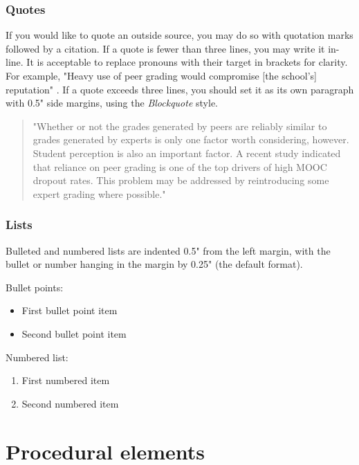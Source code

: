 \documentclass[
	letterpaper, %
]{jdf}
\begin{document}
\subsubsection{Quotes}
If you would like to quote an outside source, you may do so with quotation marks followed by a citation. If a quote is fewer than three lines, you may write it in-line. It is acceptable to replace pronouns with their target in brackets for clarity. For example, "Heavy use of peer grading would compromise [the school’s] reputation" \citep{joyner2016}. If a quote exceeds three lines, you should set it as its own paragraph with 0.5" side margins, using the \emph{Blockquote} style.

\begin{quotation}
"Whether or not the grades generated by peers are reliably similar to grades generated by experts is only one factor worth considering, however. Student perception is also an important factor. A recent study indicated that reliance on peer grading is one of the top drivers of high MOOC dropout rates. This problem may be addressed by reintroducing some expert grading where possible." \citep{joyner2016}
\end{quotation}

\subsubsection{Lists}
Bulleted and numbered lists are indented 0.5" from the left margin, with the bullet or number hanging in the margin by 0.25" (the default format).

Bullet points:

\begin{itemize}
	\item First bullet point item
	\item Second bullet point item
\end{itemize}

Numbered list:

\begin{enumerate}
	\item First numbered item
	\item Second numbered item
\end{enumerate}

\section{Procedural elements}
\end{document}
